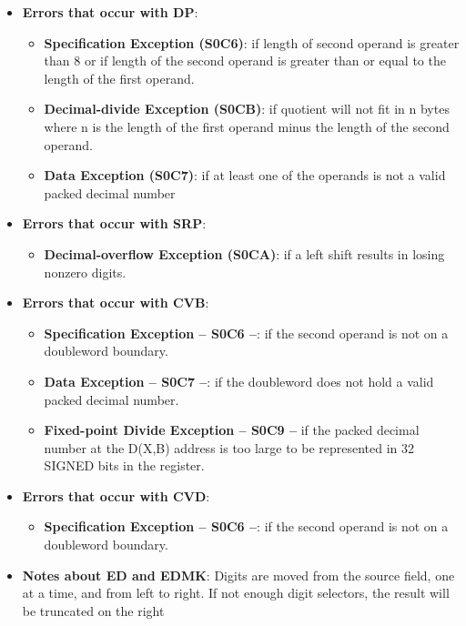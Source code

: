 \documentclass{report}
\begin{document}
\begin{itemize}
        \item \textbf{Errors that occur with DP}:
            \begin{itemize}
                \item \textbf{Specification Exception (S0C6)}: if length of second operand is greater than 8 or if length of the second operand is greater than or equal to the length of the first operand.
                \item \textbf{Decimal-divide Exception  (S0CB)}: if quotient will not fit in n bytes where n is the length of the first operand minus the length of the second operand.
                \item \textbf{Data Exception (S0C7)}: if at least one of the operands is not a valid packed decimal number 
            \end{itemize}
        \item \textbf{Errors that occur with SRP}: 
            \begin{itemize}
                \item \textbf{Decimal-overflow Exception  (S0CA)}: if a left shift results in losing nonzero digits.
            \end{itemize}
        \item \textbf{Errors that occur with CVB}: 
            \begin{itemize}
                \item \textbf{Specification Exception – S0C6 –}: if the second operand is not on a doubleword boundary.
                \item \textbf{Data Exception – S0C7 –}: if the doubleword does not hold a valid packed decimal number.
                \item \textbf{Fixed-point Divide Exception – S0C9 –} if the packed decimal number at the D(X,B) address is too large to be represented in 32 SIGNED bits in the register.
            \end{itemize}
        \item \textbf{Errors that occur with CVD}: 
            \begin{itemize}
                \item \textbf{Specification Exception – S0C6 –}: if the second operand is not on a doubleword boundary.
            \end{itemize}
        \item \textbf{Notes about ED and EDMK}: Digits are moved from the source field, one at a time, and from left to right.
            \bigbreak \noindent 
            If not enough digit selectors, the result will be truncated on the right

\end{itemize}
\end{document}
